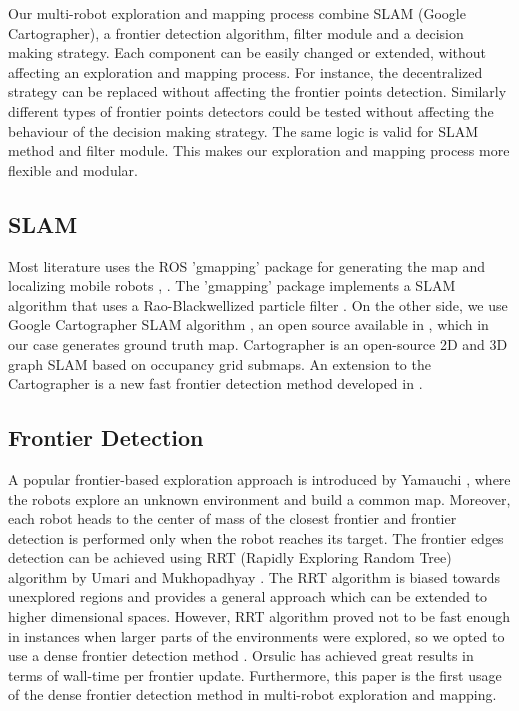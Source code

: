 Our multi-robot exploration and mapping process combine SLAM (Google Cartographer), a frontier detection algorithm, filter module and a decision making strategy. Each component can be easily changed or extended, without affecting an exploration and mapping process. For instance, the decentralized strategy can be replaced without affecting the frontier points detection. Similarly different types of frontier points detectors could be tested without affecting the behaviour of the decision making strategy. The same logic is valid for SLAM method and filter module. This makes our exploration and mapping process more flexible and modular. 

\subsection{SLAM} 
Most literature uses the ROS 'gmapping' package for generating the
map and localizing mobile robots \cite{Keidar2012}, \cite{Umari2017}. The 'gmapping' package implements a SLAM algorithm that uses a Rao-Blackwellized particle filter \cite{Grisetti2007}. 
On the other side, we use Google Cartographer SLAM algorithm \cite{Hess2016}, an open source available in \cite{cartographer}, which in our case generates ground truth map. Cartographer is an open-source 2D and 3D graph SLAM based on occupancy grid submaps. 
An extension to the Cartographer is a new fast frontier detection method developed in \cite{Orsulic2019}. 

\subsection{Frontier Detection}
A popular frontier-based exploration approach is introduced by Yamauchi \cite{Yamauchi1998}, where the robots explore an unknown environment and build a common map. Moreover, each robot heads to the center of mass of the closest frontier and frontier detection is performed only when the robot reaches its target. 
The frontier edges detection can be achieved using RRT (Rapidly Exploring Random Tree) algorithm by Umari and Mukhopadhyay \cite{Umari2017}. The RRT algorithm is biased towards unexplored regions and provides a general approach which can be extended to higher dimensional spaces. However, RRT algorithm proved not to be fast enough in instances when larger parts of the environments were explored, so we opted to use a dense frontier detection method \cite{Orsulic2019}. Orsulic has achieved great results in terms of wall-time per frontier update. Furthermore, this paper is the first usage of the dense frontier detection method in multi-robot exploration and mapping. 

